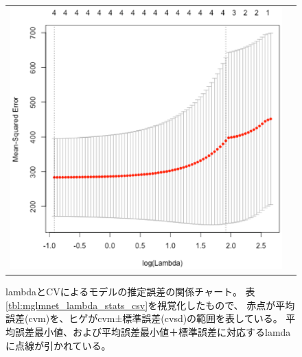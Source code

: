\begin{figure}[htbp]
\begin{center}
\begin{tabular}{cc}
\begin{minipage}{0.5\hsize}
\begin{center}
\includegraphics[scale=0.5]{./figure/lambda_error.eps}
\caption{lambdaとCVによるモデルの推定誤差の関係チャート。
表\ref{tbl:mglmnet_lambda_stats_csv}を視覚化したもので、
赤点が平均誤差(cvm)を、ヒゲがcvm±標準誤差(cvsd)の範囲を表している。
平均誤差最小値、および平均誤差最小値＋標準誤差に対応するlamdaに点線が引かれている。
\label{fig:mglmnet_lambda_error_png}}
\end{center}
\end{minipage}

\end{tabular} 
\end{center}
\end{figure} 



